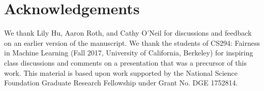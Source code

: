\section*{Acknowledgements}
We thank Lily Hu, Aaron Roth, and Cathy O'Neil for discussions and feedback on an earlier version of the manuscript. We thank the students of CS294: Fairness in Machine Learning (Fall 2017, University of California, Berkeley) for inspiring class discussions and comments on a presentation that was a precursor of this work. This material is based upon work supported by the National Science Foundation Graduate Research Fellowship under Grant No. DGE 1752814.